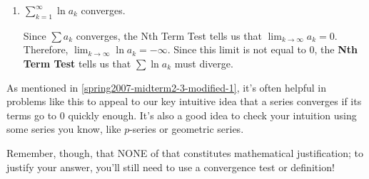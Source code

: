 \documentclass[main]{subfiles}
\begin{document}
\begin{enumerate}
\begin{enumerate}
\begin{solution}
      .  Since $\displaystyle \sum_{k=1}^\infty a_k$
      converges, we know that $a_k \to 0$ as $k \to \infty$ (this is a
      consequence of the Nth Term Test).  Therefore, as $k \to \infty$,
      $\frac{1}{a_k} \to +\infty$ (since $a_k >0$ for all $k$).  By the \textbf{Nth Term Test}, since $\displaystyle \lim_{k \to \infty}a_k \not=0$,
      $\displaystyle \sum_{k=1}^\infty \frac{1}{a_k}$ must diverge.
    \end{solution}
    
      
   \item
    \begin{problem}[\vfill]
      $\displaystyle\sum_{k=1}^{\infty} \ln a_k$ converges.
    \end{problem}

    \begin{solution}
        Since $\sum a_k$ converges, the Nth Term Test
      tells us that $\displaystyle \lim_{k \to \infty} a_k = 0$.
      Therefore, $\displaystyle \lim_{k \to \infty} \ln a_k = - \infty$.
      Since this limit is not equal to 0, the \textbf{Nth Term Test} tells
      us that $\sum \ln a_k$ must diverge.
    \end{solution}
  \end{enumerate}

  \begin{solutiononly} {\LARGE\Pointinghand} As mentioned in
    \ref{spring2007-midterm2-3-modified-1}, it's often helpful in problems
    like this to appeal to our key intuitive idea that a series converges
    if its terms go to 0 quickly enough.
    It's also a good idea to check your intuition using some series you
    know, like $p$-series or geometric series.

    Remember, though, that NONE of that constitutes mathematical
    justification; to justify your answer, you'll still need to use a
    convergence test or definition!
  \end{solutiononly}

  

  
  
 
      
      
       \probonly{\newpage}


 
  


\end{enumerate}
\end{document}
